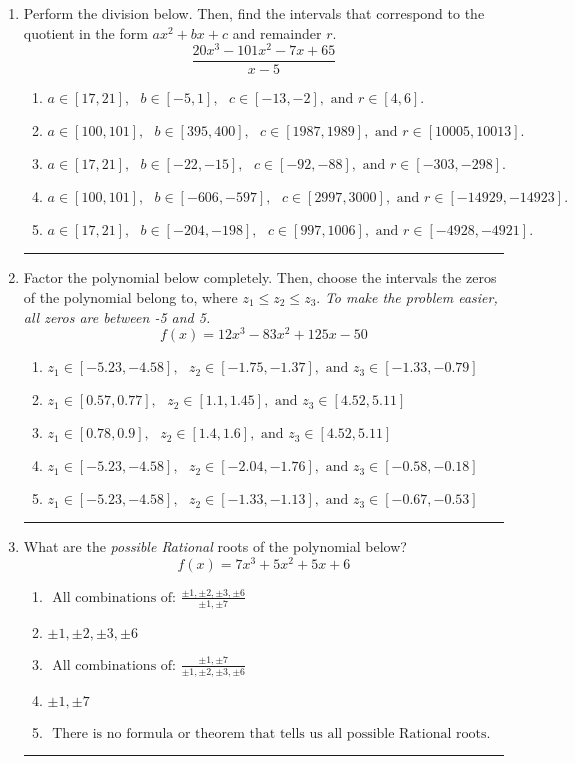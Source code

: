 \documentclass[14pt]{extbook}
\newcommand{\litem}[1]{\item#1\hspace*{-1cm}\rule{\textwidth}{0.4pt}}
\begin{document}
\begin{enumerate}
{\begin{enumerate}[label=\Alph*.]
\end{enumerate} }
\litem{
Perform the division below. Then, find the intervals that correspond to the quotient in the form $ax^2+bx+c$ and remainder $r$.\[ \frac{20x^{3} -101 x^{2} -7 x + 65}{x -5} \]\begin{enumerate}[label=\Alph*.]
\item \( a \in [17, 21], \text{   } b \in [-5, 1], \text{   } c \in [-13, -2], \text{   and   } r \in [4, 6]. \)
\item \( a \in [100, 101], \text{   } b \in [395, 400], \text{   } c \in [1987, 1989], \text{   and   } r \in [10005, 10013]. \)
\item \( a \in [17, 21], \text{   } b \in [-22, -15], \text{   } c \in [-92, -88], \text{   and   } r \in [-303, -298]. \)
\item \( a \in [100, 101], \text{   } b \in [-606, -597], \text{   } c \in [2997, 3000], \text{   and   } r \in [-14929, -14923]. \)
\item \( a \in [17, 21], \text{   } b \in [-204, -198], \text{   } c \in [997, 1006], \text{   and   } r \in [-4928, -4921]. \)

\end{enumerate} }
\litem{
Factor the polynomial below completely. Then, choose the intervals the zeros of the polynomial belong to, where $z_1 \leq z_2 \leq z_3$. \textit{To make the problem easier, all zeros are between -5 and 5.}\[ f(x) = 12x^{3} -83 x^{2} +125 x -50 \]\begin{enumerate}[label=\Alph*.]
\item \( z_1 \in [-5.23, -4.58], \text{   }  z_2 \in [-1.75, -1.37], \text{   and   } z_3 \in [-1.33, -0.79] \)
\item \( z_1 \in [0.57, 0.77], \text{   }  z_2 \in [1.1, 1.45], \text{   and   } z_3 \in [4.52, 5.11] \)
\item \( z_1 \in [0.78, 0.9], \text{   }  z_2 \in [1.4, 1.6], \text{   and   } z_3 \in [4.52, 5.11] \)
\item \( z_1 \in [-5.23, -4.58], \text{   }  z_2 \in [-2.04, -1.76], \text{   and   } z_3 \in [-0.58, -0.18] \)
\item \( z_1 \in [-5.23, -4.58], \text{   }  z_2 \in [-1.33, -1.13], \text{   and   } z_3 \in [-0.67, -0.53] \)

\end{enumerate} }
\litem{
What are the \textit{possible Rational} roots of the polynomial below?\[ f(x) = 7x^{3} +5 x^{2} +5 x + 6 \]\begin{enumerate}[label=\Alph*.]
\item \( \text{ All combinations of: }\frac{\pm 1,\pm 2,\pm 3,\pm 6}{\pm 1,\pm 7} \)
\item \( \pm 1,\pm 2,\pm 3,\pm 6 \)
\item \( \text{ All combinations of: }\frac{\pm 1,\pm 7}{\pm 1,\pm 2,\pm 3,\pm 6} \)
\item \( \pm 1,\pm 7 \)
\item \( \text{ There is no formula or theorem that tells us all possible Rational roots.} \)


\end{enumerate}}
\end{enumerate}
\end{document}
